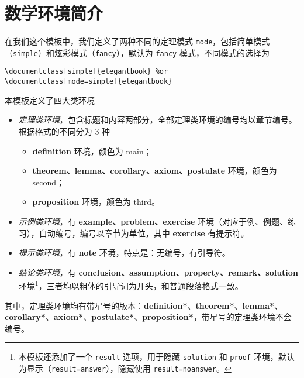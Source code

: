 \documentclass[lang=cn,newtx,10pt,scheme=chinese,color=black]{elegantbook}
\begin{document}
\section{数学环境简介}

在我们这个模板中，我们定义了两种不同的定理模式 \lstinline{mode}，包括简单模式（\lstinline{simple}）和炫彩模式（\lstinline{fancy}），默认为 \lstinline{fancy} 模式，不同模式的选择为
\begin{lstlisting}
\documentclass[simple]{elegantbook} %or
\documentclass[mode=simple]{elegantbook}
\end{lstlisting}

本模板定义了四大类环境

\begin{itemize}
  \item \textit{定理类环境}，包含标题和内容两部分，全部定理类环境的编号均以章节编号。根据格式的不同分为 3 种
    \begin{itemize}
      \item \textcolor{main}{\textbf{definition}} 环境，颜色为 \textcolor{main}{main}；
      \item \textcolor{second}{\textbf{theorem、lemma、corollary、axiom、postulate}} 环境，颜色为 \textcolor{second} {second}；
      \item \textcolor{third}{\textbf{proposition}} 环境，颜色为 \textcolor{third}{third}。
    \end{itemize}
  \item \textit{示例类环境}，有 \textbf{example、problem、exercise} 环境（对应于例、例题、练习），自动编号，编号以章节为单位，其中 \textbf{exercise} 有提示符。
  \item \textit{提示类环境}，有 \textbf{note} 环境，特点是：无编号，有引导符。
  \item \textit{结论类环境}，有 \textbf{conclusion、assumption、property、remark、solution} 环境\footnote{本模板还添加了一个 \lstinline|result| 选项，用于隐藏 \lstinline{solution} 和 \lstinline{proof} 环境，默认为显示（\lstinline{result=answer}），隐藏使用 \lstinline{result=noanswer}。}，三者均以粗体的引导词为开头，和普通段落格式一致。
\end{itemize}

其中，定理类环境均有带星号的版本：\textcolor{main}{\textbf{definition*}}、\textcolor{second}{\textbf{theorem*}}、\textcolor{second}{\textbf{lemma*}}、\textcolor{second}{\textbf{corollary*}}、\textcolor{second}{\textbf{axiom*}}、\textcolor{second}{\textbf{postulate*}}、\textcolor{third}{\textbf{proposition*}}，带星号的定理类环境不会编号。
\end{document}
